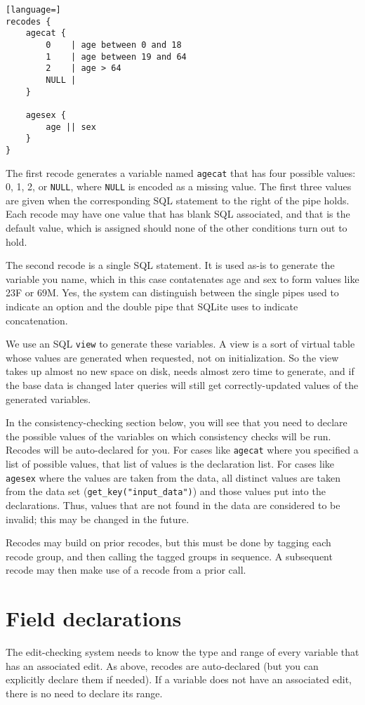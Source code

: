 \documentclass{article}
\begin{document}
\begin{lstlisting}[language=]
recodes {
    agecat {
        0    | age between 0 and 18
        1    | age between 19 and 64
        2    | age > 64
        NULL |
    }

    agesex {
        age || sex
    }
}
\end{lstlisting}

The first recode generates a variable named {\tt agecat} that has four possible values: 0,
1, 2, or {\tt NULL}, where {\tt NULL} is encoded as a missing value. The first three
values are given when the corresponding SQL statement to the right of the pipe
holds. Each recode may have one value that has blank SQL associated, and that is
the default value, which is assigned should none of the other conditions turn out to
hold. 

The second recode is a single SQL statement. It is used as-is to generate the variable you
name, which in this case contatenates age and sex to form values like 23F or 69M. Yes, the
system can distinguish between the single pipes used to indicate an option and the double
pipe that SQLite uses to indicate concatenation.

We use an SQL {\tt view} to generate these variables. A view is a sort of virtual table
whose values are generated when requested, not on initialization. So the view takes up
almost no new space on disk, needs almost zero time to generate, and if the base data is
changed later queries will still get correctly-updated values of the generated variables.

In the consistency-checking section below, you will see that you need to declare the
possible values of the variables on which consistency checks will be run. Recodes will
be auto-declared for you. For cases like {\tt agecat} where you specified a list of
possible values, that list of values is the declaration list. For cases like {\tt agesex}
where the values are taken from the data, all distinct values are taken from the data
set ({\tt get\_key("input\_data")}) and those values put into the declarations. Thus,
values that are not found in the data are considered to be invalid; this may be changed
in the future.

Recodes may build on prior recodes, but this must be done by tagging each recode group,
and then calling the tagged groups in sequence. A subsequent recode may then make use of a
recode from a prior call.

\section{Field declarations} The edit-checking system needs to know the type and range
of every variable that has an associated edit. As above, recodes are auto-declared (but
you can explicitly declare them if needed). If a variable does not have an associated
edit, there is no need to declare its range.
\end{document}
